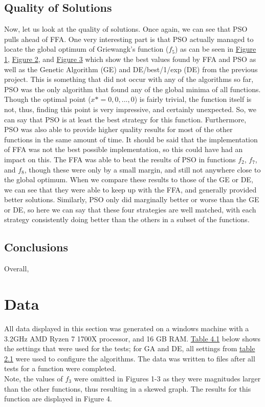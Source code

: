 \documentclass[paper=a4, fontsize=11pt]{scrartcl} %
\numberwithin{equation}{section} %
\numberwithin{figure}{section} %
\numberwithin{table}{section} %
\begin{document}
	
	\subsection{Quality of Solutions} \label{S32}
		Now, let us look at the quality of solutions. Once again, we can see that PSO pulls ahead of FFA. One very interesting part is that PSO actually managed to locate the global optimum of Griewangk's function ($f_5$) as can be seen in \hyperref[F_Best10]{Figure 1}, \hyperref[F_Best20]{Figure 2}, and \hyperref[F_Best30]{Figure 3} which show the best values found by FFA and PSO as well as the Genetic Algorithm (GE) and DE/best/1/exp (DE) from the previous project. This is something that did not occur with any of the algorithms so far, PSO was the only algorithm that found any of the global minima of all functions. Though the optimal point ($x* = 0,0, ..., 0$) is fairly trivial, the function itself is not, thus, finding this point is very impressive, and certainly unexpected. So, we can say that PSO is at least the best strategy for this function. Furthermore, PSO was also able to provide higher quality results for most of the other functions in the same amount of time. It should be said that the implementation of FFA was not the best possible implementation, so this could have had an impact on this. The FFA was able to beat the results of PSO in functions $f_2$, $f_7$, and $f_8$, though these were only by a small margin, and still not anywhere close to the global optimum. When we compare these results to those of the GE or DE, we can see that they were able to keep up with the FFA, and generally provided better solutions. Similarly, PSO only did marginally better or worse than the GE or DE, so here we can say that these four strategies are well matched, with each strategy consistently doing better than the others in a subset of the functions. 
		
		
	\subsection{Conclusions} \label{S33}
		Overall, 
	 

	
\section{Data} \label{S4}
	All data displayed in this section was generated on a windows machine with a 3.2GHz AMD Ryzen 7 1700X processor, and 16 GB RAM. \hyperref[T41]{Table 4.1} below shows the settings that were used for the tests; for GA and DE, all settings from \hyperref[T21]{table 2.1} were used to configure the algorithms. The data was written to files after all tests for a function were completed.\\ Note, the values of $f_3$ were omitted in Figures 1-3 as they were magnitudes larger than the other functions, thus resulting in a skewed graph. The results for this function are displayed in Figure 4.
\end{document}
